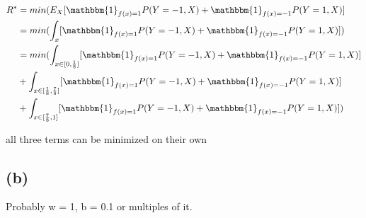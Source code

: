\documentclass[a4paper]{scrartcl}
\begin{document}
    \begin{align*}
      R^* &= min(E_X[\mathbbm{1}_{f(x)= 1} P(Y=-1, X) + \mathbbm{1}_{f(x)= -1} P(Y=1, X)]\\
      & = min(\int_x [\mathbbm{1}_{f(x)= 1} P(Y=-1, X) + \mathbbm{1}_{f(x)= -1} P(Y=1, X)])\\
      & = min(\int_{x \in [0, \frac{1}{8}]}[\mathbbm{1}_{f(x)= 1} P(Y=-1, X) + \mathbbm{1}_{f(x)= -1} P(Y=1, X)]\\
      & + \int_{x \in [\frac{1}{8}, \frac{7}{8}]}[\mathbbm{1}_{f(x)= 1} P(Y=-1, X) + \mathbbm{1}_{f(x)= -1} P(Y=1, X)]\\
      & + \int_{x \in [\frac{7}{8}, 1]}[\mathbbm{1}_{f(x)= 1} P(Y=-1, X) + \mathbbm{1}_{f(x)= -1} P(Y=1, X)])\\
    \end{align*}

    all three terms can be minimized on their own


  \subsection*{(b)}
    Probably w = 1, b = 0.1 or multiples of it.
\end{document}
